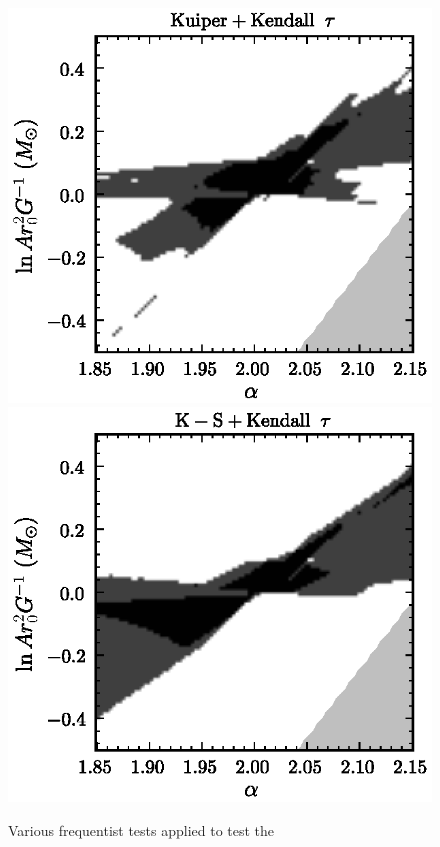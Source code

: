 \begin{figure}
\includegraphics[height=.2\textheight]{figs_solarsystem/freqKuiperKendall.ps}
\includegraphics[height=.2\textheight]{figs_solarsystem/freqKSKendall.ps}
\caption[Various frequentist test appied to test the uniformity of the
  angle distribution and the absence of angle-energy
  correlations.]{Various frequentist tests applied to test the
}
\end{figure}
